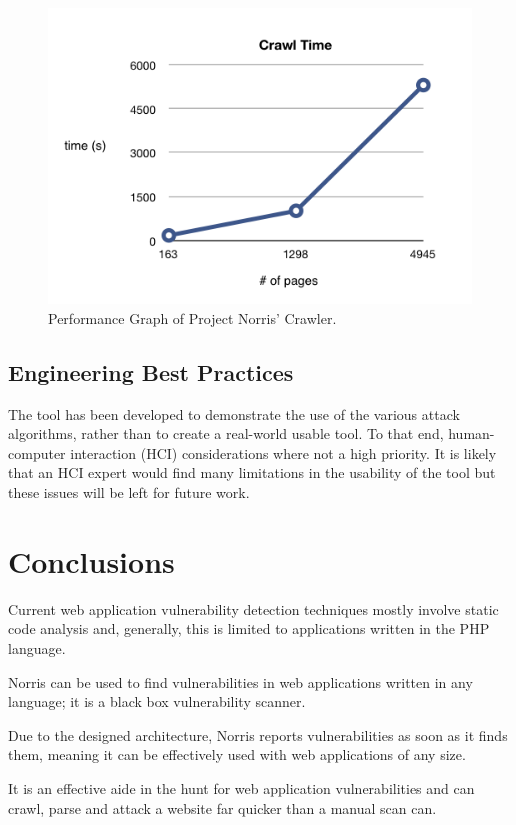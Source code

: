 \documentclass[12pt,a4paper]{article}
\begin{document}
\begin{figure}[!ht]
    \begin{center}
        \includegraphics[scale=0.6]{images/crawl_performance.png}    
    \end{center}
    \caption{Performance Graph of Project Norris' Crawler.}
    \label{fig:performance}
\end{figure}

\subsection{Engineering Best Practices}
The tool has been developed to demonstrate the use of the various attack algorithms, rather than to create a real-world usable tool.  To that end, human-computer interaction (HCI) considerations where not a high priority.  It is likely that an HCI expert would find many limitations in the usability of the tool but these issues will be left for future work.

\section{Conclusions}

Current web application vulnerability detection techniques mostly involve static code analysis and, generally, this is limited to applications written in the PHP language.

Norris can be used to find vulnerabilities in web applications written in any language; it is a black box vulnerability scanner. 

Due to the designed architecture, Norris reports vulnerabilities as soon as it finds them, meaning it can be effectively used with web applications of any size.

It is an effective aide in the hunt for web application vulnerabilities and can crawl, parse and attack a website far quicker than a manual scan can.


\end{document}
